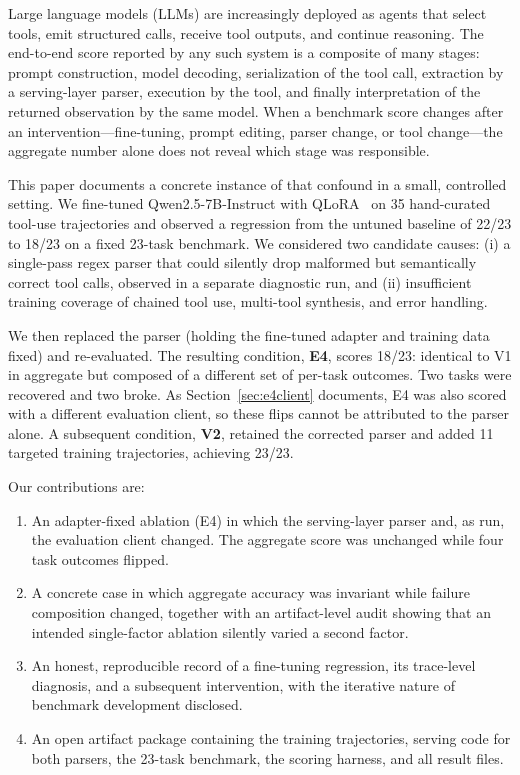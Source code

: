 \documentclass[10pt,twocolumn]{article}
\begin{document}
Large language models (LLMs) are increasingly deployed as agents that select tools, emit structured calls, receive tool outputs, and continue reasoning. The end-to-end score reported by any such system is a composite of many stages: prompt construction, model decoding, serialization of the tool call, extraction by a serving-layer parser, execution by the tool, and finally interpretation of the returned observation by the same model. When a benchmark score changes after an intervention---fine-tuning, prompt editing, parser change, or tool change---the aggregate number alone does not reveal which stage was responsible.

This paper documents a concrete instance of that confound in a small, controlled setting. We fine-tuned Qwen2.5-7B-Instruct with QLoRA~\citep{dettmers2023qlora} on 35 hand-curated tool-use trajectories and observed a regression from the untuned baseline of 22/23 to 18/23 on a fixed 23-task benchmark. We considered two candidate causes: (i) a single-pass regex parser that could silently drop malformed but semantically correct tool calls, observed in a separate diagnostic run, and (ii) insufficient training coverage of chained tool use, multi-tool synthesis, and error handling.

We then replaced the parser (holding the fine-tuned adapter and training data fixed) and re-evaluated. The resulting condition, \textbf{E4}, scores 18/23: identical to V1 in aggregate but composed of a different set of per-task outcomes. Two tasks were recovered and two broke. As Section~\ref{sec:e4client} documents, E4 was also scored with a different evaluation client, so these flips cannot be attributed to the parser alone. A subsequent condition, \textbf{V2}, retained the corrected parser and added 11 targeted training trajectories, achieving 23/23.

Our contributions are:
\begin{enumerate}\itemsep2pt
\item An adapter-fixed ablation (E4) in which the serving-layer parser and, as run, the evaluation client changed. The aggregate score was unchanged while four task outcomes flipped.
\item A concrete case in which aggregate accuracy was invariant while failure composition changed, together with an artifact-level audit showing that an intended single-factor ablation silently varied a second factor.
\item An honest, reproducible record of a fine-tuning regression, its trace-level diagnosis, and a subsequent intervention, with the iterative nature of benchmark development disclosed.
\item An open artifact package containing the training trajectories, serving code for both parsers, the 23-task benchmark, the scoring harness, and all result files.
\end{enumerate}
\end{document}
